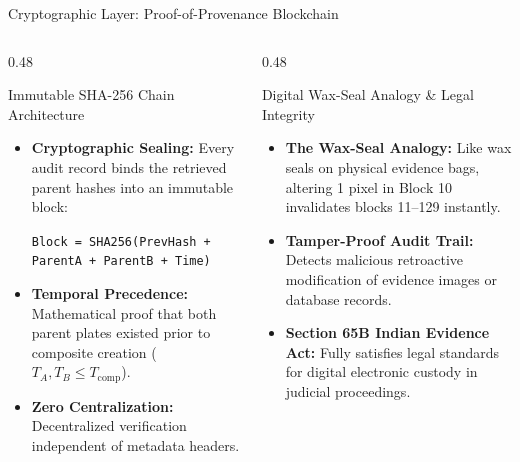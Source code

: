 \documentclass[aspectratio=169,xcolor=table,10pt]{beamer}
\begin{document}
\begin{frame}{Cryptographic Layer: Proof-of-Provenance Blockchain}
  \begin{columns}[T]
    \begin{column}{0.48\textwidth}
      \begin{block}{Immutable SHA-256 Chain Architecture}
        \small
        \begin{itemize}
          \item \textbf{Cryptographic Sealing:} Every audit record binds the retrieved parent hashes into an immutable block:
            \begin{center}
              \scriptsize \texttt{Block = SHA256(PrevHash + ParentA + ParentB + Time)}
            \end{center}
          \item \textbf{Temporal Precedence:} Mathematical proof that both parent plates existed prior to composite creation ($T_A, T_B \le T_{\text{comp}}$).
          \item \textbf{Zero Centralization:} Decentralized verification independent of metadata headers.
        \end{itemize}
      \end{block}
    \end{column}

    \begin{column}{0.48\textwidth}
      \begin{exampleblock}{Digital Wax-Seal Analogy \& Legal Integrity}
        \small
        \begin{itemize}
          \item \textbf{The Wax-Seal Analogy:} Like wax seals on physical evidence bags, altering 1 pixel in Block 10 invalidates blocks 11--129 instantly.
          \item \textbf{Tamper-Proof Audit Trail:} Detects malicious retroactive modification of evidence images or database records.
          \item \textbf{Section 65B Indian Evidence Act:} Fully satisfies legal standards for digital electronic custody in judicial proceedings.
        \end{itemize}
      \end{exampleblock}
    \end{column}
  \end{columns}
\end{frame}
\end{document}
